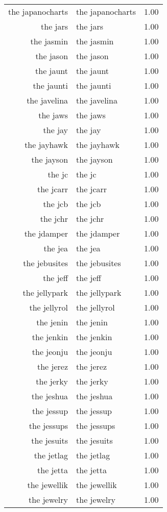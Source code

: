 \begin{table}[ht]
\begin{tabular}{rlr}
  the japanocharts & the japanocharts & 1.00 \\ 
  the jars & the jars & 1.00 \\ 
  the jasmin & the jasmin & 1.00 \\ 
  the jason & the jason & 1.00 \\ 
  the jaunt & the jaunt & 1.00 \\ 
  the jaunti & the jaunti & 1.00 \\ 
  the javelina & the javelina & 1.00 \\ 
  the jaws & the jaws & 1.00 \\ 
  the jay & the jay & 1.00 \\ 
  the jayhawk & the jayhawk & 1.00 \\ 
  the jayson & the jayson & 1.00 \\ 
  the jc & the jc & 1.00 \\ 
  the jcarr & the jcarr & 1.00 \\ 
  the jcb & the jcb & 1.00 \\ 
  the jchr & the jchr & 1.00 \\ 
  the jdamper & the jdamper & 1.00 \\ 
  the jea & the jea & 1.00 \\ 
  the jebusites & the jebusites & 1.00 \\ 
  the jeff & the jeff & 1.00 \\ 
  the jellypark & the jellypark & 1.00 \\ 
  the jellyrol & the jellyrol & 1.00 \\ 
  the jenin & the jenin & 1.00 \\ 
  the jenkin & the jenkin & 1.00 \\ 
  the jeonju & the jeonju & 1.00 \\ 
  the jerez & the jerez & 1.00 \\ 
  the jerky & the jerky & 1.00 \\ 
  the jeshua & the jeshua & 1.00 \\ 
  the jessup & the jessup & 1.00 \\ 
  the jessups & the jessups & 1.00 \\ 
  the jesuits & the jesuits & 1.00 \\ 
  the jetlag & the jetlag & 1.00 \\ 
  the jetta & the jetta & 1.00 \\ 
  the jewellik & the jewellik & 1.00 \\ 
  the jewelry & the jewelry & 1.00 \\ 

\end{tabular}
\end{table}
